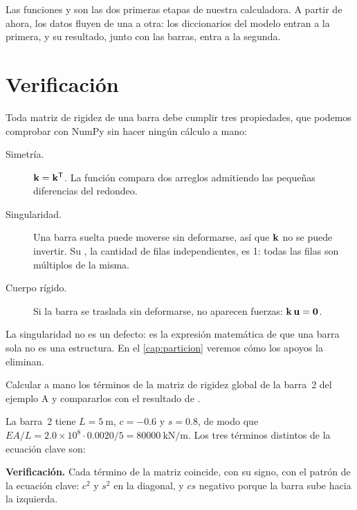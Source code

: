 Las funciones  y  son las dos
primeras etapas de nuestra calculadora. A partir de ahora, los datos fluyen
de una a otra: los diccionarios del modelo entran a la primera, y su
resultado, junto con las barras, entra a la segunda.

\section{Verificación}\label{sec:verificacion_rigidez}

Toda matriz de rigidez de una barra debe cumplir tres propiedades, que
podemos comprobar con NumPy sin hacer ningún cálculo a mano:

\begin{description}
  \item[Simetría.] $\mathbf{k} = \mathbf{k}^\mathsf{T}$. La función  compara
    dos arreglos admitiendo las pequeñas diferencias del redondeo.
  \item[Singularidad.] Una barra suelta puede moverse sin deformarse, así
    que $\mathbf{k}$ no se puede invertir. Su , la cantidad
    de filas independientes, es 1: todas las filas son múltiplos de la
    misma.
  \item[Cuerpo rígido.] Si la barra se traslada sin deformarse, no aparecen
    fuerzas: $\mathbf{k}\,\mathbf{u} = \mathbf{0}$.
\end{description}



La singularidad no es un defecto: es la expresión matemática de que una barra
sola no es una estructura. En el \cref{cap:particion} veremos cómo los apoyos
la eliminan.

\begin{problemaresuelto}
Calcular a mano los términos de la matriz de rigidez global de la barra~2 del
ejemplo A y compararlos con el resultado de .

\solucion
La barra~2 tiene $L = \SI{5}{\metre}$, $c = -0.6$ y $s = 0.8$, de modo que
$EA/L = 2.0\times10^{8} \cdot 0.0020 / 5 = \SI{80000}{\kilo\newton\per\metre}$.
Los tres términos distintos de la ecuación clave son:

\textbf{Verificación.} Cada término de la matriz coincide, con su signo, con
el patrón de la ecuación clave: $c^2$ y $s^2$ en la diagonal, y $cs$ negativo
porque la barra sube hacia la izquierda.
\end{problemaresuelto}

